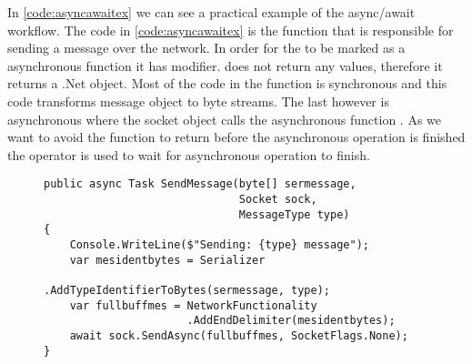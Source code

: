 In \autoref{code:asyncawaitex} we can see a practical example of the async/await workflow.
The code in \autoref{code:asyncawaitex} is the function that is responsible for sending a message over the network. In order for the  to be marked as a asynchronous function it has  modifier.  does not return any values, therefore it returns a .Net  object. Most of the code in the function is synchronous and this code transforms message object to byte streams. The last however is asynchronous where the socket object calls the asynchronous function . As we want to avoid the function to return before the asynchronous operation is finished the  operator is used to wait for asynchronous operation to finish.
\begin{figure}[h]
	\centering
	\begin{lstlisting}[label = code:asyncawaitex, caption=Example of async/await workflow, captionpos=b, basicstyle=\scriptsize]
public async Task SendMessage(byte[] sermessage, 
                              Socket sock, 
                              MessageType type)
{
    Console.WriteLine($"Sending: {type} message");
    var mesidentbytes = Serializer
                        .AddTypeIdentifierToBytes(sermessage, type);
    var fullbuffmes = NetworkFunctionality
                      .AddEndDelimiter(mesidentbytes);
    await sock.SendAsync(fullbuffmes, SocketFlags.None);
}


	\end{lstlisting}
\end{figure}


%
